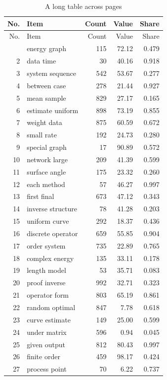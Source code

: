 \documentclass[11pt]{article}
\begin{document}
\begin{longtable}{rlrrr}
\caption{A long table across pages}\\
\toprule
No. & Item & Count & Value & Share \\
\midrule
\endfirsthead
\toprule
No. & Item & Count & Value & Share \\
\midrule
\endhead
\bottomrule
\endfoot
  1 & energy graph & 115 & 72.12 & 0.479 \\
  2 & data time & 30 & 40.16 & 0.918 \\
  3 & system sequence & 542 & 53.67 & 0.277 \\
  4 & between case & 278 & 21.44 & 0.927 \\
  5 & mean sample & 829 & 27.17 & 0.165 \\
  6 & estimate uniform & 898 & 73.19 & 0.855 \\
  7 & weight data & 875 & 60.59 & 0.672 \\
  8 & small rate & 192 & 24.73 & 0.280 \\
  9 & special graph & 17 & 90.89 & 0.572 \\
  10 & network large & 209 & 41.39 & 0.599 \\
  11 & surface angle & 175 & 23.32 & 0.260 \\
  12 & each method & 57 & 46.27 & 0.997 \\
  13 & first final & 673 & 47.12 & 0.343 \\
  14 & inverse structure & 78 & 41.28 & 0.203 \\
  15 & uniform curve & 292 & 18.37 & 0.436 \\
  16 & discrete operator & 659 & 55.85 & 0.904 \\
  17 & order system & 735 & 22.89 & 0.765 \\
  18 & complex energy & 135 & 33.11 & 0.178 \\
  19 & length model & 53 & 35.71 & 0.083 \\
  20 & proof inverse & 992 & 32.71 & 0.323 \\
  21 & operator form & 803 & 65.19 & 0.861 \\
  22 & random optimal & 847 & 7.78 & 0.618 \\
  23 & curve estimate & 149 & 25.00 & 0.599 \\
  24 & under matrix & 596 & 0.94 & 0.045 \\
  25 & given output & 812 & 80.43 & 0.997 \\
  26 & finite order & 459 & 98.17 & 0.424 \\
  27 & process point & 70 & 6.22 & 0.737 \\

\end{longtable}
\end{document}
